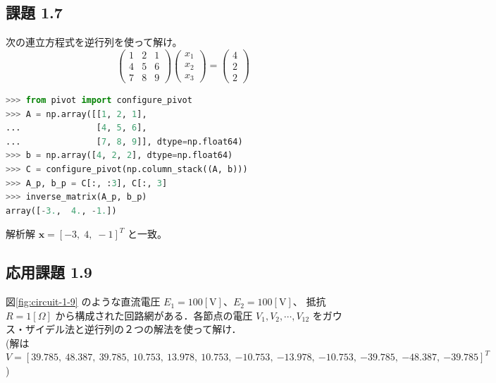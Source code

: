 \documentclass[12pt,a4paper]{ltjsreport}
\begin{document}
\subsection*{課題 1.7}
次の連立方程式を逆行列を使って解け。
\begin{equation}
\begin{pmatrix}
1 & 2 & 1 \\
4 & 5 & 6 \\
7 & 8 & 9
\end{pmatrix}
\begin{pmatrix}
x_1 \\
x_2 \\
x_3
\end{pmatrix}
=
\begin{pmatrix}
4 \\
2 \\
2
\end{pmatrix}
\end{equation}

\bigskip
\begin{lstlisting}[language=Python, numbers=none]
>>> from pivot import configure_pivot
>>> A = np.array([[1, 2, 1],
...               [4, 5, 6],
...               [7, 8, 9]], dtype=np.float64)
>>> b = np.array([4, 2, 2], dtype=np.float64)
>>> C = configure_pivot(np.column_stack((A, b)))
>>> A_p, b_p = C[:, :3], C[:, 3]
>>> inverse_matrix(A_p, b_p)
array([-3.,  4., -1.])
\end{lstlisting}
解析解 $\boldsymbol{x} = [-3,\; 4,\; -1]^T$ と一致。

\subsection*{応用課題 1.9}
図\ref{fig:circuit-1-9} のような直流電圧 $E_1 = 100[\mathrm{V}]$、$E_2 = 100[\mathrm{V}]$、
抵抗 $R = 1[\Omega]$ から構成された回路網がある．各節点の電圧 $V_1, V_2, \cdots, V_{12}$ をガウス・ザイデル法と逆行列の２つの解法を使って解け．\\[0.5em]
(解は $V = [39.785,\allowbreak\ 48.387,\allowbreak\ 39.785,\allowbreak\ 10.753,\allowbreak\ 13.978,\allowbreak\ 10.753,\allowbreak\ {-10.753},\allowbreak\ {-13.978},\allowbreak\ {-10.753},\allowbreak\ {-39.785},\allowbreak\ {-48.387},\allowbreak\ {-39.785}]^T$)
\end{document}
